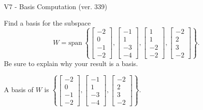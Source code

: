 \begin{exercise}
  \begin{exerciseTitle}V7 - Basis Computation (ver. 339)\end{exerciseTitle}
  \begin{exerciseStatement}
    Find a basis for the subspace 
\[W=\mathrm{span}\ \left\{\left[\begin{array}{r}
-2 \\
0 \\
-1 \\
-2
\end{array}\right] , \left[\begin{array}{r}
-1 \\
1 \\
-3 \\
-4
\end{array}\right] , \left[\begin{array}{r}
1 \\
1 \\
-2 \\
-2
\end{array}\right] , \left[\begin{array}{r}
-2 \\
2 \\
3 \\
-2
\end{array}\right]\right\}.\]
 Be sure to explain why your result is a basis.


  \end{exerciseStatement}
  \begin{exerciseAnswer}
   A basis of \(W\) is  \(\left\{\left[\begin{array}{r}
-2 \\
0 \\
-1 \\
-2
\end{array}\right] , \left[\begin{array}{r}
-1 \\
1 \\
-3 \\
-4
\end{array}\right] , \left[\begin{array}{r}
-2 \\
2 \\
3 \\
-2
\end{array}\right]\right\}\).
  


  \end{exerciseAnswer}
\end{exercise}
